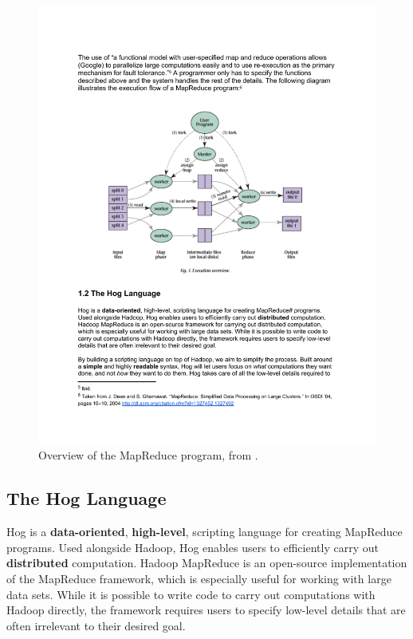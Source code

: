 \documentclass{report}
\begin{document}
\begin{center}
\begin{figure}
  \label{fig:map_reduce_overview}
  \includegraphics[width=1.0\textwidth]{img/map_reduce_overview.pdf}
  \caption{Overview of the MapReduce program, from \cite{ghemawat:2003}.}
\end{figure}
\end{center}

\subsection{The Hog Language}
\label{sub:hog_language}

Hog is a \textbf{data-oriented}, \textbf{high-level}, scripting language for
creating MapReduce programs. Used alongside Hadoop, Hog enables users to
efficiently carry out \textbf{distributed} computation. Hadoop MapReduce is an
open-source implementation of the MapReduce framework, which is especially useful
for working with large data sets. While it is possible to write code to carry out
computations with Hadoop directly, the framework requires users to specify
low-level details that are often irrelevant to their desired goal.
\end{document}
